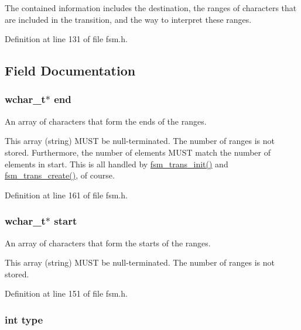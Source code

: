 \-The contained information includes the destination, the ranges of characters that are included in the transition, and the way to interpret these ranges. 

\-Definition at line 131 of file fsm.\-h.



\subsection{\-Field \-Documentation}
\hypertarget{structfsm__trans_aa1e2bbde6a40f4d42da0674048ea3099}{
\subsubsection[{end}]{\setlength{\rightskip}{0pt plus 5cm}wchar\-\_\-t$\ast$ {\bf end}}}\label{structfsm__trans_aa1e2bbde6a40f4d42da0674048ea3099}


\-An array of characters that form the ends of the ranges. 

\-This array (string) \-M\-U\-S\-T be null-\/terminated. \-The number of ranges is not stored. \-Furthermore, the number of elements \-M\-U\-S\-T match the number of elements in start. \-This is all handled by \hyperlink{fsm_2datastructs_8c_a1ee5d4d7276a5ca86ba5f9f2947a2a57}{fsm\-\_\-trans\-\_\-init()} and \hyperlink{fsm_2datastructs_8c_a96f9a93d3836ac3b7e60e5d07c8fd953}{fsm\-\_\-trans\-\_\-create()}, of course. 

\-Definition at line 161 of file fsm.\-h.

\hypertarget{structfsm__trans_a57644b772e7a7502cf7bae92933f1dee}{
\subsubsection[{start}]{\setlength{\rightskip}{0pt plus 5cm}wchar\-\_\-t$\ast$ {\bf start}}}\label{structfsm__trans_a57644b772e7a7502cf7bae92933f1dee}


\-An array of characters that form the starts of the ranges. 

\-This array (string) \-M\-U\-S\-T be null-\/terminated. \-The number of ranges is not stored. 

\-Definition at line 151 of file fsm.\-h.

\hypertarget{structfsm__trans_ac765329451135abec74c45e1897abf26}{
\subsubsection[{type}]{\setlength{\rightskip}{0pt plus 5cm}int {\bf type}}}\label{structfsm__trans_ac765329451135abec74c45e1897abf26}


